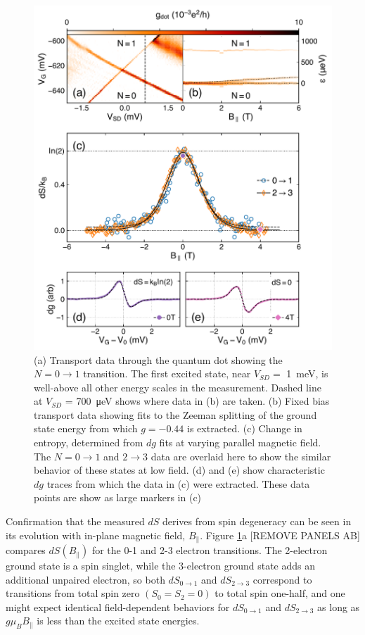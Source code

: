 \documentclass[twocolumn,showpacs,preprintnumbers,amsmath,amssymb,pra,aps,superscriptaddress]{revtex4-1}
\begin{document}
\begin{figure}
        \includegraphics[width=1.0\columnwidth]{../figures/figure_3.pdf}
        \caption{\label{fig:fig3}(a) Transport data through the quantum dot showing the $N=0 \rightarrow 1$ transition. The first excited state, near $V_{SD} = $ \SI{1}{\milli\electronvolt}, is well-above all other energy scales in the measurement. Dashed line at $V_{SD}$ = \SI{700}{\micro\electronvolt} shows where data in (b) are taken. (b) Fixed bias transport data showing fits to the Zeeman splitting of the ground state energy from which $g = -0.44$ is extracted. (c) Change in entropy, determined from $dg$ fits at varying parallel magnetic field. The $N=0 \rightarrow 1$ and $2 \rightarrow 3$ data are overlaid here to show the similar behavior of these states at low field. (d) and (e) show characteristic $dg$ traces from which the data in (c) were extracted. These data points are show as large markers in (c)}
\end{figure}

Confirmation that the measured $dS$ derives from spin degeneracy can be seen in its evolution with in-plane magnetic field, $B_\parallel$. Figure \ref{fig:fig3}a [REMOVE PANELS AB] compares $dS(B_\parallel)$ for the 0-1 and 2-3 electron transitions.  The 2-electron ground state is a spin singlet, while the 3-electron ground state adds an additional unpaired electron, so both $dS_{0 \rightarrow 1}$ and $dS_{2 \rightarrow 3}$ correspond to transitions from total spin zero $(S_0=S_2=0)$ to total spin one-half, and one might expect identical field-dependent behaviors for $dS_{0\rightarrow 1}$ and $dS_{2\rightarrow 3}$ as long as $g \mu_{B} B_\parallel$ is less than the excited state energies.
\end{document}
